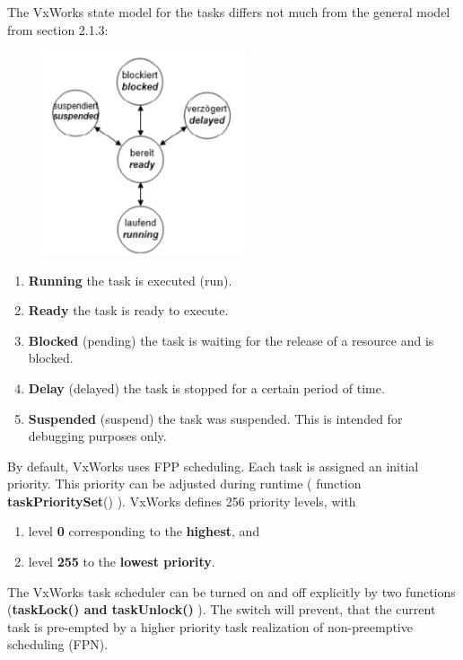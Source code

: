 The VxWorks state model for the tasks differs not much from the general model from section 2.1.3:

 	\begin{figure}[h]
    \centering
    \includegraphics[width=6cm, height=6cm]{Images/image128.png}
    \label{fig:Fig 79}
    \end{figure}

\begin{enumerate}
\item  \textbf{Running} the task is executed (run).

\item  \textbf{Ready} the task is ready to execute.

\item  \textbf{Blocked} (pending) the task is waiting for the release of a resource and is blocked.

\item  \textbf{Delay} (delayed) the task is stopped for a certain period of time.

\item  \textbf{Suspended} (suspend) the task was suspended. This is intended for debugging purposes only.
\end{enumerate}

By default, VxWorks uses FPP scheduling. Each task is assigned an initial priority. This priority can be adjusted during runtime ( function \textbf{taskPrioritySet}() ). VxWorks defines 256 priority levels, with 

\begin{enumerate}
\item  level \textbf{0} corresponding to the \textbf{highest}, and 

\item  level \textbf{255} to the \textbf{lowest priority}.
\end{enumerate}

The VxWorks task scheduler can be turned on and off explicitly by two functions (\textbf{taskLock() and taskUnlock()} ). The switch will prevent, that the current task is pre-empted by a higher priority task  realization of non-preemptive scheduling (FPN).\\

